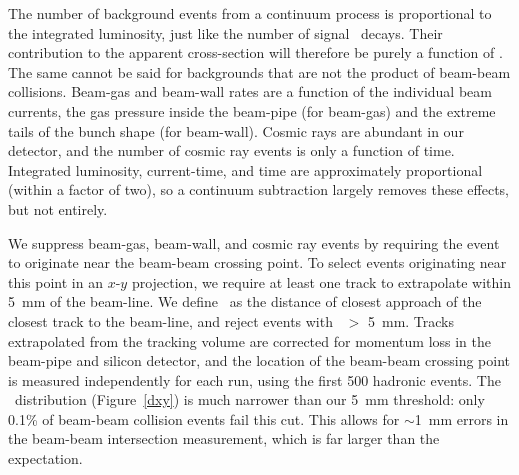 \documentclass{cornell}
\begin{document}
The number of background events from a continuum process is
proportional to the integrated luminosity, just like the number of
signal \ups\ decays.  Their contribution to the apparent cross-section
will therefore be purely a function of \ecm.  The same cannot be said
for backgrounds that are not the product of beam-beam collisions.
Beam-gas and beam-wall rates are a function of the individual beam
currents, the gas pressure inside the beam-pipe (for beam-gas) and the
extreme tails of the bunch shape (for beam-wall).  Cosmic rays are
abundant in our detector, and the number of cosmic ray events is only
a function of time.  Integrated luminosity, current-time, and time are
approximately proportional (within a factor of two), so a continuum
subtraction largely removes these effects, but not entirely.

We suppress beam-gas, beam-wall, and cosmic ray events by requiring
the event to originate near the beam-beam crossing point.  To select
events originating near this point in an $x$-$y$ projection, we
require at least one track to extrapolate within 5~mm of the beam-line.
We define \dxy\ as the distance of closest approach of the closest
track to the beam-line, and reject events with \dxy\ $>$ 5~mm.  Tracks
extrapolated from the tracking volume are corrected for momentum loss
in the beam-pipe and silicon detector, and the location of the
beam-beam crossing point is measured independently for each run, using
the first 500 hadronic events.  The \dxy\ distribution
(Figure~\ref{dxy}) is much narrower than our 5~mm threshold: only
0.1\% of beam-beam collision events fail this cut.  This allows for
$\sim$1~mm errors in the beam-beam intersection measurement, which is
far larger than the expectation.
\end{document}
